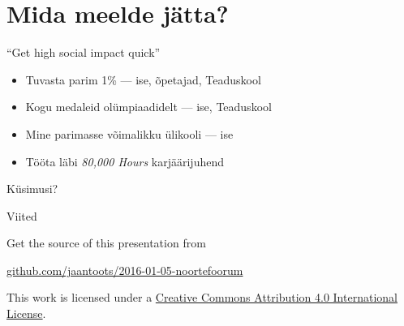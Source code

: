 \documentclass{beamer}
\begin{document}
\section{Mida meelde jätta?}

\begin{frame}{``Get \alert{high social impact} quick''}

  \begin{itemize}
  \item Tuvasta parim 1\% --- ise, õpetajad, Teaduskool
  \item Kogu medaleid olümpiaadidelt --- ise, Teaduskool
  \item Mine parimasse võimalikku ülikooli --- ise
  \item Tööta läbi \emph{80,000 Hours} karjäärijuhend
  \end{itemize}

\end{frame}

\begin{frame}[standout]
  Küsimusi?
\end{frame}

\appendix

\begin{frame}[allowframebreaks]{Viited}

  
  

\end{frame}

\begin{frame}[plain]
  Get the source of this presentation from

  \begin{center}
    \href{https://github.com/jaantoots/2016-01-05-noortefoorum}{github.com/jaantoots/2016-01-05-noortefoorum}
  \end{center}

  This work is licensed under a
  \href{http://creativecommons.org/licenses/by/4.0/}{Creative Commons
    Attribution 4.0 International License}.

  \begin{center}\ccby\end{center}
\end{frame}
\end{document}

